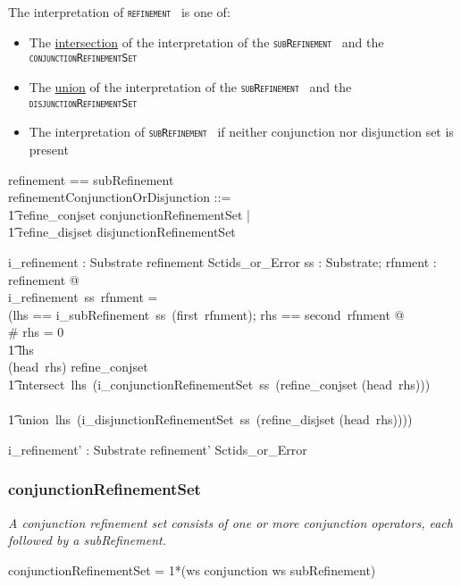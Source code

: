 \documentclass{article}
\def\spec#1{{\tt \small \textsc{{#1}} }}
\def\bnf#1{{\scriptsize {{#1}} }}
\def\desc#1{{\small \textsl{{#1}} }}
\begin{document}
The interpretation of \spec{refinement} is one of:
\begin{itemize}[noitemsep,nolistsep]
\item The \underline{intersection} of the interpretation of the \spec{subRefinement} and the \spec{conjunctionRefinementSet}
\item The \underline{union} of the interpretation of the \spec{subRefinement} and the \spec{disjunctionRefinementSet}
\item The interpretation of  \spec{subRefinement} if neither conjunction nor disjunction set is present
\end{itemize}

\begin{zed}
refinement == subRefinement \cross \optional[refinementConjunctionOrDisjunction] \\
[refinement']
\also
refinementConjunctionOrDisjunction ::= \\
\t1 refine\_conjset \ldata conjunctionRefinementSet \rdata | \\
\t1 refine\_disjset \ldata disjunctionRefinementSet \rdata
\end{zed}




\begin{gendef}
   i\_refinement : Substrate \fun refinement \fun Sctids\_or\_Error
\where
   \forall ss : Substrate; rfnment : refinement @ \\
    i\_refinement~ss~rfnment = \\
   (\LET lhs == i\_subRefinement~ss~(first~rfnment); rhs == second~rfnment @ \\
   \IF \# rhs = 0 \THEN \\
   \t1 lhs \\
    \ELSE \IF (head~rhs) \in \ran refine\_conjset \THEN  \\
    \t1 intersect~lhs~(i\_conjunctionRefinementSet~ss~(refine\_conjset \inv (head~rhs))) \\
  \ELSE \\
  \t1 union~lhs~(i\_disjunctionRefinementSet~ss~(refine\_disjset \inv (head~rhs))))
\end{gendef}
\begin{gendef}
   i\_refinement' : Substrate \fun refinement' \fun Sctids\_or\_Error
\end{gendef}

\subsubsection{conjunctionRefinementSet}
\begin{framed}
\desc{A conjunction refinement set consists of one or more conjunction operators, each followed by a subRefinement.}
\end{framed}
\begin{framed}
\noindent
\bnf{conjunctionRefinementSet = 1*(ws conjunction ws subRefinement)}
\end{framed}
\end{document}
